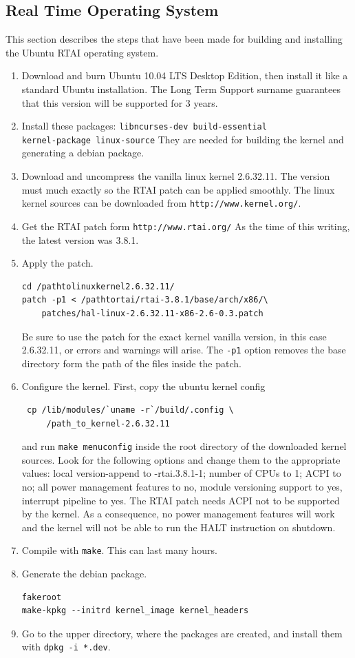 \subsection{Real Time Operating System}
This section describes the steps that have been made for building and installing the Ubuntu RTAI operating system.
\begin{enumerate}
 \item Download and burn Ubuntu 10.04 LTS Desktop Edition, then install it like a standard Ubuntu installation.
The Long Term Support surname guarantees that this version will be supported for 3 years.
\item Install these packages: \texttt{libncurses-dev build-essential \\ kernel-package linux-source}
They are needed for building the kernel and generating a debian package.
\item Download and uncompress the vanilla linux kernel 2.6.32.11. The version must much exactly so the RTAI patch
can be applied smoothly. The linux kernel sources can be downloaded from \texttt{http://www.kernel.org/}.
\item Get the RTAI patch form \texttt{http://www.rtai.org/} As the time of this writing, the latest version was 3.8.1.
\item Apply the patch.
\begin{verbatim}
cd /pathtolinuxkernel2.6.32.11/
patch -p1 < /pathtortai/rtai-3.8.1/base/arch/x86/\
    patches/hal-linux-2.6.32.11-x86-2.6-0.3.patch
\end{verbatim} 
Be sure to use the patch for the exact kernel vanilla version, in this case 2.6.32.11, or errors and warnings
will arise. The \texttt{-p1} option removes the base directory form the path of the files inside the patch.
\item Configure the kernel. First, copy the ubuntu kernel config
\begin{verbatim}
 cp /lib/modules/`uname -r`/build/.config \
     /path_to_kernel-2.6.32.11
\end{verbatim} 
and run \texttt{make menuconfig} inside the root directory of the downloaded kernel sources. Look for the following options
and change them to the appropriate values: local version-append to -rtai.3.8.1-1; number of CPUs to 1; ACPI to no;
all power management features to no, module versioning support to yes, interrupt pipeline to yes.
The RTAI patch needs ACPI not to be supported by the kernel. As a consequence, no power management features will
work and the kernel will not be able to run the HALT instruction on shutdown.
\item Compile with \texttt{make}. This can last many hours.
\item Generate the debian package.
\begin{verbatim}
fakeroot
make-kpkg --initrd kernel_image kernel_headers
\end{verbatim} 
\item Go to the upper directory, where the packages are created, and install them with \texttt{dpkg -i *.dev}.
\end{enumerate}
